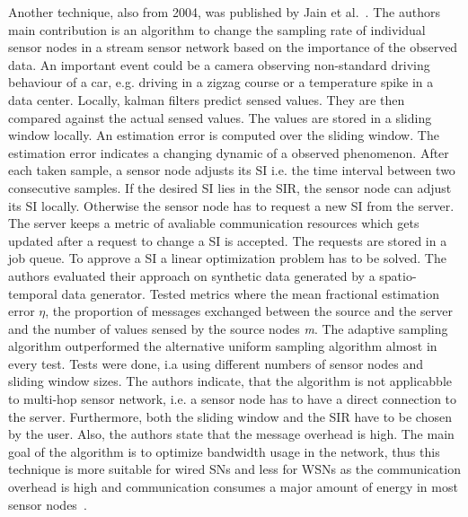 Another technique, also from 2004, was published by Jain et
al.~\cite{jain2004adaptive}. The authors main contribution is an algorithm to
change the sampling rate of individual sensor nodes in a stream sensor network
based on the importance of the observed data. An important event could be a
camera observing non-standard driving behaviour of a car, e.g. driving in a
zigzag course or a temperature spike in a data center. Locally, kalman filters
predict sensed values. They are then compared against the actual sensed values.
The values are stored in a sliding window locally. An estimation error is
computed over the sliding window. The estimation error indicates a changing
dynamic of a observed phenomenon. After each taken sample, a sensor node
adjusts its \ac{SI} i.e. the time interval between two consecutive samples. If
the desired \ac{SI} lies in the \ac{SIR}, the sensor node can adjust its
\ac{SI} locally. Otherwise the sensor node has to request a new \ac{SI} from
the server. The server keeps a metric of avaliable communication resources
which gets updated after a request to change a \ac{SI} is accepted. The
requests are stored in a job queue. To approve a \ac{SI} a linear optimization
problem has to be solved. The authors evaluated their approach on synthetic
data generated by a spatio-temporal data generator. Tested metrics where the
mean fractional estimation error $ \eta $, the proportion of messages exchanged
between the source and the server and the number of values sensed by the source
nodes \textit{m}. The adaptive sampling algorithm outperformed the alternative
uniform sampling algorithm almost in every test. Tests were done, i.a using
different numbers of sensor nodes and sliding window sizes. The authors
indicate, that the algorithm is not applicabble to multi-hop sensor network,
i.e. a sensor node has to have a direct connection to the server. Furthermore,
both the sliding window and the \ac{SIR} have to be chosen by the user. Also,
the authors state that the message overhead is high. The main goal of the
algorithm is to optimize bandwidth usage in the network, thus this technique is
more suitable for wired \acp{SN} and less for \acp{WSN} as the communication
overhead is high and communication consumes a major amount of energy in
most sensor nodes~\cite{raghunathan2002energy}.

\par

